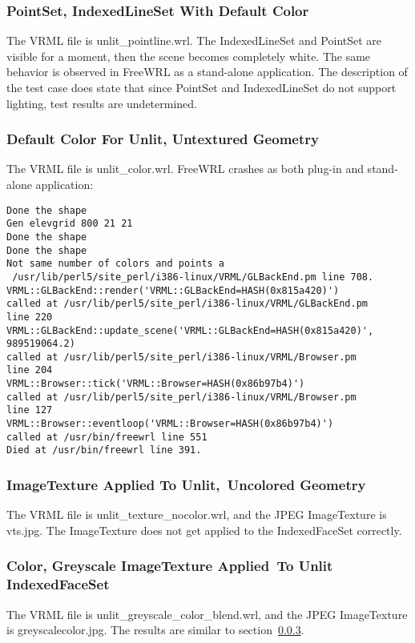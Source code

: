 \documentclass[12pt,letterpaper]{article}
\newcommand{\AppE}{PointSet, IndexedLineSet With Default Color}
\newcommand{\AppF}{Default Color For Unlit, Untextured Geometry}
\newcommand{\AppGa}{ImageTexture Applied To Unlit,~}
\newcommand{\AppGb}{Uncolored Geometry}
\newcommand{\AppHa}{Color, Greyscale ImageTexture Applied~}
\newcommand{\AppHb}{To Unlit IndexedFaceSet}
\begin{document}
\subsubsection{\AppE}
The VRML file is unlit\_pointline.wrl.\newline
The IndexedLineSet and PointSet are visible for a moment, then the scene becomes completely white. 
The same behavior is observed in FreeWRL as a stand-alone application.\newline
The description of the test case does state that since PointSet and IndexedLineSet do not support
lighting, test results are undetermined.

\subsubsection{\AppF}
The VRML file is unlit\_color.wrl.\newline
FreeWRL crashes as both plug-in and stand-alone application:
\begin{verbatim}
Done the shape
Gen elevgrid 800 21 21
Done the shape
Done the shape
Not same number of colors and points a
 /usr/lib/perl5/site_perl/i386-linux/VRML/GLBackEnd.pm line 708.
VRML::GLBackEnd::render('VRML::GLBackEnd=HASH(0x815a420)')
called at /usr/lib/perl5/site_perl/i386-linux/VRML/GLBackEnd.pm
line 220
VRML::GLBackEnd::update_scene('VRML::GLBackEnd=HASH(0x815a420)',
989519064.2)
called at /usr/lib/perl5/site_perl/i386-linux/VRML/Browser.pm
line 204
VRML::Browser::tick('VRML::Browser=HASH(0x86b97b4)')
called at /usr/lib/perl5/site_perl/i386-linux/VRML/Browser.pm
line 127
VRML::Browser::eventloop('VRML::Browser=HASH(0x86b97b4)')
called at /usr/bin/freewrl line 551
Died at /usr/bin/freewrl line 391.
\end{verbatim}

\subsubsection{\AppGa\AppGb}
\label{sec:unlit-texture-nocolor}
The VRML file is unlit\_texture\_nocolor.wrl, and the JPEG ImageTexture is vts.jpg.\newline
The ImageTexture does not get applied to the IndexedFaceSet correctly.

\subsubsection{\AppHa\AppHb}
The VRML file is unlit\_greyscale\_color\_blend.wrl, and the JPEG ImageTexture
is greyscalecolor.jpg.\newline
The results are similar to section~\ref{sec:unlit-texture-nocolor}.
\end{document}
